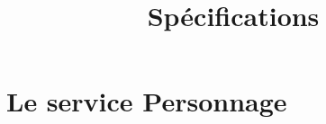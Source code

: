 \documentclass[a4paper, 11pt, notitlepage]{report}
\title{
  \huge Spécifications \\
}
\author{
  }
\date{}
\begin{document}
\maketitle


\section{Le service Personnage}
\end{document}
